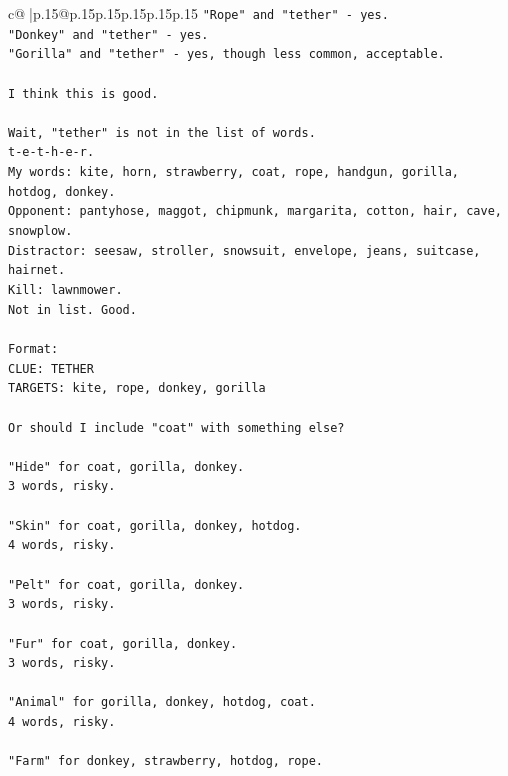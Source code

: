 \documentclass{article}
\begin{document}
{\begin{supertabular}{c@{$\;$}|p{.15\linewidth}@{}p{.15\linewidth}p{.15\linewidth}p{.15\linewidth}p{.15\linewidth}p{.15\linewidth}}
{{{\texttt{"Rope" and "tether" {-} yes.} \\
\texttt{"Donkey" and "tether" {-} yes.} \\
\texttt{"Gorilla" and "tether" {-} yes, though less common, acceptable.} \\
\\ 
\texttt{I think this is good.} \\
\\ 
\texttt{Wait, "tether" is not in the list of words.} \\
\texttt{t{-}e{-}t{-}h{-}e{-}r.} \\
\texttt{My words: kite, horn, strawberry, coat, rope, handgun, gorilla, hotdog, donkey.} \\
\texttt{Opponent: pantyhose, maggot, chipmunk, margarita, cotton, hair, cave, snowplow.} \\
\texttt{Distractor: seesaw, stroller, snowsuit, envelope, jeans, suitcase, hairnet.} \\
\texttt{Kill: lawnmower.} \\
\texttt{Not in list. Good.} \\
\\ 
\texttt{Format:} \\
\texttt{CLUE: TETHER} \\
\texttt{TARGETS: kite, rope, donkey, gorilla} \\
\\ 
\texttt{Or should I include "coat" with something else?} \\
\\ 
\texttt{"Hide" for coat, gorilla, donkey.} \\
\texttt{3 words, risky.} \\
\\ 
\texttt{"Skin" for coat, gorilla, donkey, hotdog.} \\
\texttt{4 words, risky.} \\
\\ 
\texttt{"Pelt" for coat, gorilla, donkey.} \\
\texttt{3 words, risky.} \\
\\ 
\texttt{"Fur" for coat, gorilla, donkey.} \\
\texttt{3 words, risky.} \\
\\ 
\texttt{"Animal" for gorilla, donkey, hotdog, coat.} \\
\texttt{4 words, risky.} \\
\\ 
\texttt{"Farm" for donkey, strawberry, hotdog, rope.} \\
}}}
\end{supertabular}}
\end{document}
